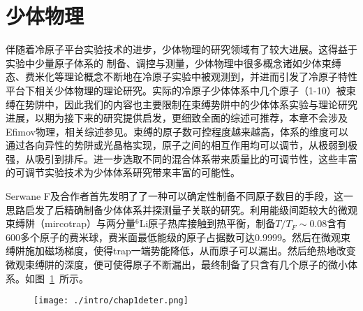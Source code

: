 \section{少体物理}\label{sec:fewbody}
伴随着冷原子平台实验技术的进步，少体物理的研究领域有了较大进展。这得益于实验中少量原子体系的
制备、调控与测量，少体物理中很多概念诸如少体束缚态、费米化等理论概念不断地在冷原子实验中被观测到，并进而引发了冷原子特性平台下相关少体物理的理论研究。实际的冷原子少体体系中几个原子（1-10）被束缚在势阱中，因此我们的内容也主要限制在束缚势阱中的少体体系实验与理论研究进展，以期为接下来的研究提供启发，更细致全面的综述可推荐\cite{sowinski2019one,blume2012few}，本章不会涉及Efimov物理，相关综述参见\cite{nielsen2001three,braaten2006universality,KohlerMolFRRMP}。束缚的原子数可控程度越来越高，体系的维度可以通过各向异性的势阱或光晶格实现，原子之间的相互作用均可以调节，从极弱到极强，从吸引到排斥。进一步选取不同的混合体系带来质量比的可调节性，这些丰富的可调节实验技术为少体体系研究带来丰富的可能性。
\begin{comment}
实验中最早制备出费米子少体体系可以追溯到2005年，在较深的光晶格体系中,进入到莫特绝缘体区域，制备少体体系\cite{greiner2002quantum,EsslingerFermiSea,Esslinger1DMol,Esslinger3DMol,Ospelkaus3DMol,Hecker3DMol,SalaCIRMol}。如图~\ref{3dmol}~所示，
\begin{figure}[!htbp]
    \centering
    \texttt{[image: chap13dmol.png]}
    \bicaption{三维光晶格中的Feshbach分子态。散点代表不同晶格深度的实验数据。实线代表理论数据。摘自 \citep{Esslinger3DMol}}{The measured binding energy of molecules in a 3D optical lattice. Scatterd points for defferent depth of latice. The solid line for theory. Reprinted from \citep{Esslinger3DMol}}
    \label{3dmol}
\end{figure}
实验观测到了较深光晶格内调节磁场形成的Feshbach分子态。
\end{comment}
Serwane F及合作者首先发明了了一种可以确定性制备不同原子数目的手段\cite{SerwaneDeterministic}，这一思路启发了后精确制备少体体系并探测量子关联的研究\cite{zurn2012fermionization,WenzFermiSeaOnebyOne,Zurn2013Pairing,MurmannSpinChain,MurmannTwoFermionDoubleWell,RontaniTunneling}。利用能级间距较大的微观束缚阱（mircotrap）与两分量${}^6$Li原子热库接触到热平衡，制备$T/T_F\sim0.08$含有600多个原子的费米球，费米面最低能级的原子占据数可达0.9999。然后在微观束缚阱施加磁场梯度，使得trap一端势能降低，从而原子可以漏出。然后绝热地改变微观束缚阱的深度，便可使得原子不断漏出，最终制备了只含有几个原子的微小体系。如图~\ref{deter}~所示。
\begin{figure}[!htbp]
    \centering
    \texttt{[image: ./intro/chap1deter.png]}
    \label{deter}
\end{figure}

